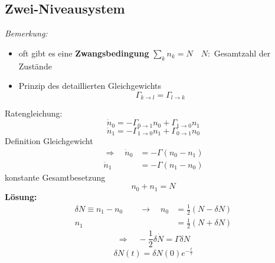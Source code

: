 \subsection{Zwei-Niveausystem}

\begin{center}
\end{center}
\emph{Bemerkung:}
\begin{itemize}
	\item oft gibt es eine \textbf{Zwangsbedingung} $ \sum_k n_k = N \quad N : $ Gesamtzahl der Zustände
	\item Prinzip des detaillierten Gleichgewichts
	\begin{equation*}
	\Gamma_{k \to l} = \Gamma_{l \to k}
	\end{equation*}
\end{itemize}
Ratengleichung:
\begin{equation*}
\dot{n}_0 = - \Gamma_{0 \to 1} n_0 + \Gamma_{1 \to 0} n_1
\end{equation*}
\begin{equation*}
\dot{n}_1 = - \Gamma_{1 \to 0} n_1 + \Gamma_{0 \to 1} n_0
\end{equation*}
Definition Gleichgewicht
\begin{align*}
\Rightarrow \quad \dot{n}_0 &= - \Gamma(n_0 - n_1) \\
\dot{n}_1 &= - \Gamma (n_1 - n_0)
\end{align*}
konstante Gesamtbesetzung
\begin{equation*}
n_0 + n_1 = N
\end{equation*}
\textbf{Lösung:}
\begin{align*}
\delta N \equiv n_1 - n_0 \qquad \rightarrow \quad n_0 &= \frac{1}{2} (N - \delta N) \\
n_1 &= \frac{1}{2} (N + \delta N)
\end{align*}
\begin{equation*}
\Rightarrow \quad - \frac{1}{2} \delta \dot{N} = \Gamma \delta N
\end{equation*}
\begin{equation*}
\delta N(t) = \delta N(0) e^{-\frac{t}{\tau}}
\end{equation*}

